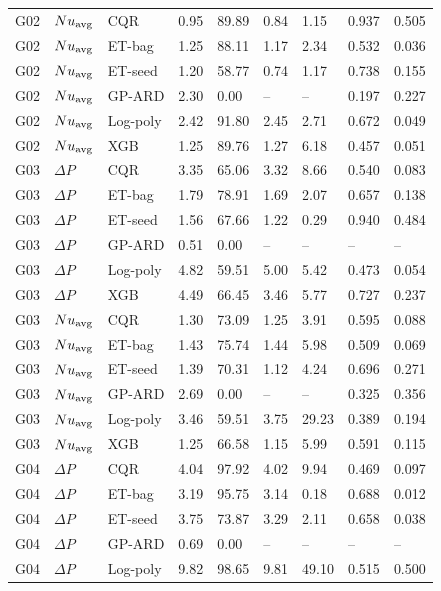 \begin{longtable}{lllllllll}
G02 & $Nu_{\rm avg}$ & CQR & 0.95 & 89.89 & 0.84 & 1.15 & 0.937 & 0.505\\
G02 & $Nu_{\rm avg}$ & ET-bag & 1.25 & 88.11 & 1.17 & 2.34 & 0.532 & 0.036\\
G02 & $Nu_{\rm avg}$ & ET-seed & 1.20 & 58.77 & 0.74 & 1.17 & 0.738 & 0.155\\
G02 & $Nu_{\rm avg}$ & GP-ARD & 2.30 & 0.00 & -- & -- & 0.197 & 0.227\\
G02 & $Nu_{\rm avg}$ & Log-poly & 2.42 & 91.80 & 2.45 & 2.71 & 0.672 & 0.049\\
G02 & $Nu_{\rm avg}$ & XGB & 1.25 & 89.76 & 1.27 & 6.18 & 0.457 & 0.051\\
G03 & $\Delta P$ & CQR & 3.35 & 65.06 & 3.32 & 8.66 & 0.540 & 0.083\\
G03 & $\Delta P$ & ET-bag & 1.79 & 78.91 & 1.69 & 2.07 & 0.657 & 0.138\\
G03 & $\Delta P$ & ET-seed & 1.56 & 67.66 & 1.22 & 0.29 & 0.940 & 0.484\\
G03 & $\Delta P$ & GP-ARD & 0.51 & 0.00 & -- & -- & -- & --\\
G03 & $\Delta P$ & Log-poly & 4.82 & 59.51 & 5.00 & 5.42 & 0.473 & 0.054\\
G03 & $\Delta P$ & XGB & 4.49 & 66.45 & 3.46 & 5.77 & 0.727 & 0.237\\
G03 & $Nu_{\rm avg}$ & CQR & 1.30 & 73.09 & 1.25 & 3.91 & 0.595 & 0.088\\
G03 & $Nu_{\rm avg}$ & ET-bag & 1.43 & 75.74 & 1.44 & 5.98 & 0.509 & 0.069\\
G03 & $Nu_{\rm avg}$ & ET-seed & 1.39 & 70.31 & 1.12 & 4.24 & 0.696 & 0.271\\
G03 & $Nu_{\rm avg}$ & GP-ARD & 2.69 & 0.00 & -- & -- & 0.325 & 0.356\\
G03 & $Nu_{\rm avg}$ & Log-poly & 3.46 & 59.51 & 3.75 & 29.23 & 0.389 & 0.194\\
G03 & $Nu_{\rm avg}$ & XGB & 1.25 & 66.58 & 1.15 & 5.99 & 0.591 & 0.115\\
G04 & $\Delta P$ & CQR & 4.04 & 97.92 & 4.02 & 9.94 & 0.469 & 0.097\\
G04 & $\Delta P$ & ET-bag & 3.19 & 95.75 & 3.14 & 0.18 & 0.688 & 0.012\\
G04 & $\Delta P$ & ET-seed & 3.75 & 73.87 & 3.29 & 2.11 & 0.658 & 0.038\\
G04 & $\Delta P$ & GP-ARD & 0.69 & 0.00 & -- & -- & -- & --\\
G04 & $\Delta P$ & Log-poly & 9.82 & 98.65 & 9.81 & 49.10 & 0.515 & 0.500\\

\end{longtable}
